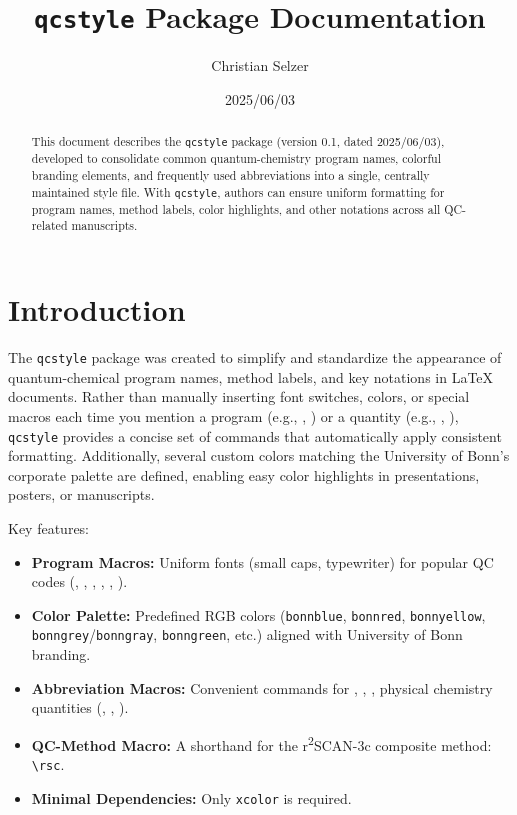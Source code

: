 \documentclass[a4paper,12pt]{article}
\title{\texttt{qcstyle} Package Documentation}
\author{Christian Selzer}
\date{2025/06/03}
\begin{document}
\maketitle

\begin{abstract}
This document describes the \texttt{qcstyle} package (version 0.1, dated 2025/06/03), developed to consolidate common quantum-chemistry program names, colorful branding elements, and frequently used abbreviations into a single, centrally maintained style file. With \texttt{qcstyle}, authors can ensure uniform formatting for program names, method labels, color highlights, and other notations across all QC-related manuscripts. 
\end{abstract}

\tableofcontents
\bigskip

\section{Introduction}
The \texttt{qcstyle} package was created to simplify and standardize the appearance of quantum-chemical program names, method labels, and key notations in LaTeX documents. Rather than manually inserting font switches, colors, or special macros each time you mention a program (e.g., \orca, \xtb) or a quantity (e.g., \pka, \dgsolv), \texttt{qcstyle} provides a concise set of commands that automatically apply consistent formatting. Additionally, several custom colors matching the University of Bonn’s corporate palette are defined, enabling easy color highlights in presentations, posters, or manuscripts.  

\medskip
Key features:
\begin{itemize}
  \item \textbf{Program Macros:} Uniform fonts (small caps, typewriter) for popular QC codes (\orca, \censo, \draco, \crest, \xtb, \tblite).
  \item \textbf{Color Palette:} Predefined RGB colors (\texttt{bonnblue}, \texttt{bonnred}, \texttt{bonnyellow}, \texttt{bonngrey}/\texttt{bonngray}, \texttt{bonngreen}, etc.) aligned with University of Bonn branding.
  \item \textbf{Abbreviation Macros:} Convenient commands for \etal, \ie, \eg, physical chemistry quantities (\pka, \dgsolv, \kcalmol).
  \item \textbf{QC-Method Macro:} A shorthand for the r\textsuperscript{2}SCAN-3c composite method: \verb|\rsc|.
  \item \textbf{Minimal Dependencies:} Only \texttt{xcolor} is required. 
\end{itemize}
\end{document}

